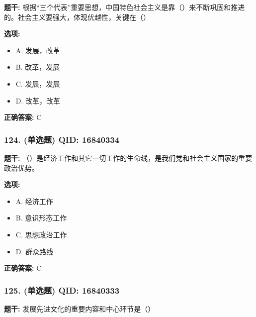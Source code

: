 \documentclass[12pt,UTF8]{ctexart}
\begin{document}
\textbf{题干:}
根据“三个代表”重要思想，中国特色社会主义是靠（）来不断巩固和推进的。社会主义要强大，体现优越性，关键在（）

\textbf{选项:}
\begin{itemize}[leftmargin=*]

  \item A. 发展，改革

  \item B. 改革，发展

  \item C. 发展，发展

  \item D. 改革，改革

\end{itemize}

\textbf{正确答案:}
C

\vspace{0.3em}\hrulefill\vspace{0.7em}

\subsubsection*{124. (单选题) \small QID: 16840334}

\textbf{题干:}
（）是经济工作和其它一切工作的生命线，是我们党和社会主义国家的重要政治优势。

\textbf{选项:}
\begin{itemize}[leftmargin=*]

  \item A. 经济工作

  \item B. 意识形态工作

  \item C. 思想政治工作

  \item D. 群众路线

\end{itemize}

\textbf{正确答案:}
C

\vspace{0.3em}\hrulefill\vspace{0.7em}

\subsubsection*{125. (单选题) \small QID: 16840333}

\textbf{题干:}
发展先进文化的重要内容和中心环节是（）
\end{document}
